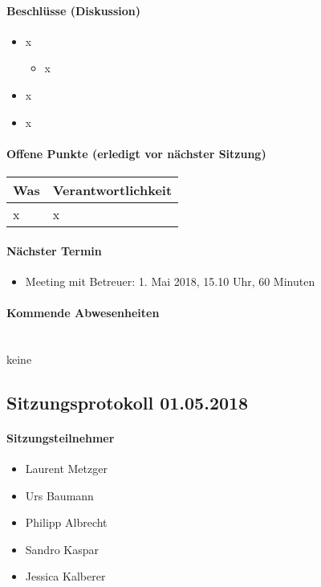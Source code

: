 \paragraph{Beschlüsse (Diskussion)}
\begin{itemize}	
	\item x
	\begin{itemize}
		\item x
	\end{itemize}
	\item x
	\item x
\end{itemize}

\paragraph{Offene Punkte (erledigt vor nächster Sitzung)} \mbox{}

\begin{table}[H]
	\centering
	\begin{tabularx}{\textwidth}{X | p{4.5cm}}
		\rowcolor{gray!50}
		\textbf{Was} & \textbf{Verantwortlichkeit} \\
		\hline
		x & x \\	
	\end{tabularx}
	\label{tab:my-label}
\end{table}

\paragraph{Nächster Termin}
\begin{itemize}	
	\item Meeting mit Betreuer: 1. Mai 2018, 15.10 Uhr, 60 Minuten
\end{itemize}

\paragraph{Kommende Abwesenheiten} \mbox{}\\
keine

\newpage



\subsection{Sitzungsprotokoll 01.05.2018}

\paragraph{Sitzungsteilnehmer}
\begin{itemize}	
	\item Laurent Metzger 
	\item Urs Baumann
	\item Philipp Albrecht
	\item Sandro Kaspar
	\item Jessica Kalberer
\end{itemize}

